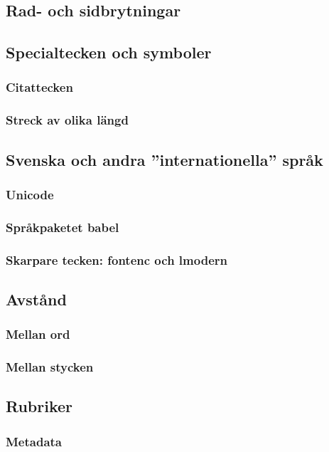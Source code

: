 \documentclass[swe,12pt]{skrapport}
\newcommand\pack[1]{\textsf{#1}}						%
\begin{document}
	\subsection{Rad- och sidbrytningar}
	
	\subsection{Specialtecken och symboler}
	\subsubsection{Citattecken}
	\subsubsection{Streck av olika längd}
	
	\subsection{Svenska och andra ''internationella'' språk}
	\subsubsection{Unicode}
	\subsubsection{Språkpaketet \pack{babel}}
	\subsubsection{Skarpare tecken: \pack{fontenc} och \pack{lmodern}}
	
	\subsection{Avstånd}
	\subsubsection{Mellan ord}
	\subsubsection{Mellan stycken}
	
	\subsection{Rubriker}
	\subsubsection{Metadata}
\end{document}

